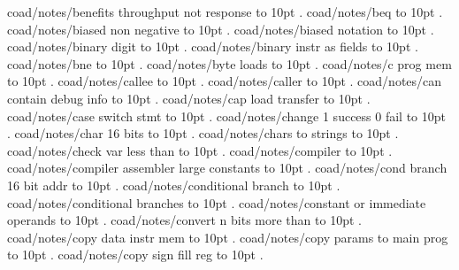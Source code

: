 \smallskip
coad/notes/benefits throughput not response \leaders\hbox to 10pt {\hss.\hss}  \hfill {}
\smallskip
coad/notes/beq \leaders\hbox to 10pt {\hss.\hss}  \hfill {}
\smallskip
coad/notes/biased non negative \leaders\hbox to 10pt {\hss.\hss}  \hfill {}
\smallskip
coad/notes/biased notation \leaders\hbox to 10pt {\hss.\hss}  \hfill {}
\smallskip
coad/notes/binary digit \leaders\hbox to 10pt {\hss.\hss}  \hfill {}
\smallskip
coad/notes/binary instr as fields \leaders\hbox to 10pt {\hss.\hss}  \hfill {}
\smallskip
coad/notes/bne \leaders\hbox to 10pt {\hss.\hss}  \hfill {}
\smallskip
coad/notes/byte loads \leaders\hbox to 10pt {\hss.\hss}  \hfill {}
\smallskip
coad/notes/c prog mem \leaders\hbox to 10pt {\hss.\hss}  \hfill {}
\smallskip
coad/notes/callee \leaders\hbox to 10pt {\hss.\hss}  \hfill {}
\smallskip
coad/notes/caller \leaders\hbox to 10pt {\hss.\hss}  \hfill {}
\smallskip
coad/notes/can contain debug info \leaders\hbox to 10pt {\hss.\hss}  \hfill {}
\smallskip
coad/notes/cap load transfer \leaders\hbox to 10pt {\hss.\hss}  \hfill {}
\smallskip
coad/notes/case switch stmt \leaders\hbox to 10pt {\hss.\hss}  \hfill {}
\smallskip
coad/notes/change 1 success 0 fail \leaders\hbox to 10pt {\hss.\hss}  \hfill {}
\smallskip
coad/notes/char 16 bits \leaders\hbox to 10pt {\hss.\hss}  \hfill {}
\smallskip
coad/notes/chars to strings \leaders\hbox to 10pt {\hss.\hss}  \hfill {}
\smallskip
coad/notes/check var less than \leaders\hbox to 10pt {\hss.\hss}  \hfill {}
\smallskip
coad/notes/compiler \leaders\hbox to 10pt {\hss.\hss}  \hfill {}
\smallskip
coad/notes/compiler assembler large constants \leaders\hbox to 10pt {\hss.\hss}  \hfill {}
\smallskip
coad/notes/cond branch 16 bit addr \leaders\hbox to 10pt {\hss.\hss}  \hfill {}
\smallskip
coad/notes/conditional branch \leaders\hbox to 10pt {\hss.\hss}  \hfill {}
\smallskip
coad/notes/conditional branches \leaders\hbox to 10pt {\hss.\hss}  \hfill {}
\smallskip
coad/notes/constant or immediate operands \leaders\hbox to 10pt {\hss.\hss}  \hfill {}
\smallskip
coad/notes/convert n bits more than \leaders\hbox to 10pt {\hss.\hss}  \hfill {}
\smallskip
coad/notes/copy data instr mem \leaders\hbox to 10pt {\hss.\hss}  \hfill {}
\smallskip
coad/notes/copy params to main prog \leaders\hbox to 10pt {\hss.\hss}  \hfill {}
\smallskip
coad/notes/copy sign fill reg \leaders\hbox to 10pt {\hss.\hss}  \hfill {}

